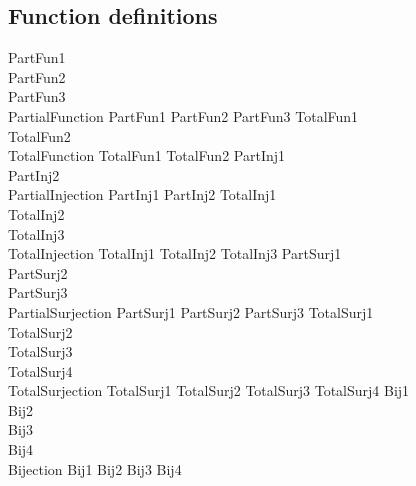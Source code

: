 \documentclass{article}
\begin{document}
\subsection{Function definitions}
\begin{zed}
  PartFun1 \\
  PartFun2 \\
  PartFun3 \\
  PartialFunction  PartFun1 \land PartFun2 \land PartFun3
  \also
  TotalFun1 \\
  TotalFun2 \\
  TotalFunction  TotalFun1 \land TotalFun2
  \also
  PartInj1 \\
  PartInj2 \\
  PartialInjection  PartInj1 \land PartInj2
  \also
  TotalInj1 \\
  TotalInj2 \\
  TotalInj3 \\
  TotalInjection  TotalInj1 \land TotalInj2 \land TotalInj3
  \also
  PartSurj1 \\
  PartSurj2 \\
  PartSurj3 \\
  PartialSurjection  PartSurj1 \land PartSurj2 \land PartSurj3
  \also
  TotalSurj1 \\
  TotalSurj2 \\
  TotalSurj3 \\
  TotalSurj4 \\
  TotalSurjection  TotalSurj1 \land TotalSurj2 \land TotalSurj3 \land TotalSurj4
  \also
  Bij1 \\
  Bij2 \\
  Bij3 \\
  Bij4 \\
  Bijection  Bij1 \land Bij2 \land Bij3 \land Bij4
\end{zed}
\end{document}
